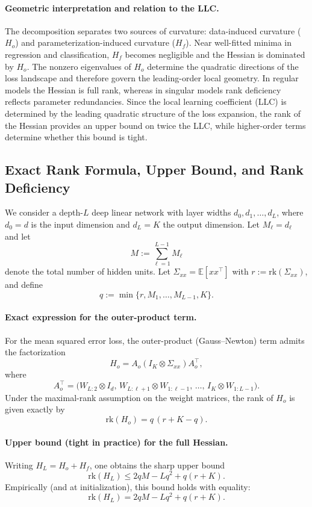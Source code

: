 \documentclass{article}
\theoremstyle{definition}
\begin{document}
\paragraph{Geometric interpretation and relation to the LLC.}
The decomposition separates two sources of curvature: data-induced curvature ($H_o$) and parameterization-induced curvature ($H_f$). Near well-fitted minima in regression and classification, $H_f$ becomes negligible and the Hessian is dominated by $H_o$. The nonzero eigenvalues of $H_o$ determine the quadratic directions of the loss landscape and therefore govern the leading-order local geometry. In regular models the Hessian is full rank, whereas in singular models rank deficiency reflects parameter redundancies. Since the local learning coefficient (LLC) is determined by the leading quadratic structure of the loss expansion, the rank of the Hessian provides an upper bound on twice the LLC, while higher-order terms determine whether this bound is tight.
\subsection{Exact Rank Formula, Upper Bound, and Rank Deficiency}

We consider a depth-$L$ deep linear network with layer widths
$d_0, d_1, \dots, d_L$, where $d_0 = d$ is the input dimension
and $d_L = K$ the output dimension.
Let $M_\ell = d_\ell$ and let
\[
M := \sum_{\ell=1}^{L-1} M_\ell
\]
denote the total number of hidden units.
Let $\Sigma_{xx} = \mathbb{E}[xx^\top]$ with
$r := \mathrm{rk}(\Sigma_{xx})$, and define
\[
q := \min\{r, M_1, \dots, M_{L-1}, K\}.
\]

\paragraph{Exact expression for the outer-product term.}
For the mean squared error loss,
the outer-product (Gauss--Newton) term admits the factorization
\[
H_o = A_o (I_K \otimes \Sigma_{xx}) A_o^\top,
\]
where
\[
A_o^\top
=
\big(
W_{L:2} \otimes I_d,
\,
W_{L:\ell+1} \otimes W_{1:\ell-1},
\,
\dots,
\,
I_K \otimes W_{1:L-1}
\big).
\]
Under the maximal-rank assumption on the weight matrices,
the rank of $H_o$ is given exactly by
\[
\mathrm{rk}(H_o)
=
q \, (r + K - q).
\]

\paragraph{Upper bound (tight in practice) for the full Hessian.}
Writing $H_L = H_o + H_f$, one obtains the sharp upper bound
\[
\mathrm{rk}(H_L)
\le
2 q M - L q^2 + q(r + K).
\]
Empirically (and at initialization), this bound holds with equality:
\[
\mathrm{rk}(H_L)
=
2 q M - L q^2 + q(r + K).
\]
\end{document}

